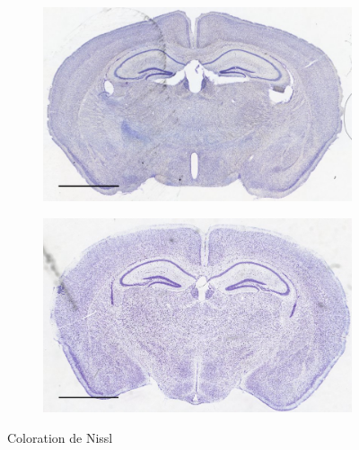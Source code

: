 \begin{figure}[h]
\begin{center}
\begin{subfigure}[h]{0.49\textwidth}
		\end{subfigure}
		\begin{subfigure}[h]{0.49\textwidth}%
			\caption{}
			\label{fig:MaleWTNissl}
			\includegraphics[width=\textwidth]{./Images/Nissl/MaleWT.jpg}
		\end{subfigure}
		\begin{subfigure}[h]{0.49\textwidth}%
			\caption{}
			\label{fig:MaleMutNissl}
			\includegraphics[width=\textwidth]{./Images/Nissl/MaleMut.jpg}
		\end{subfigure}
	\end{center}
	\caption{Coloration de Nissl}
	\label{fig:NisslResultat}
\end{figure}

